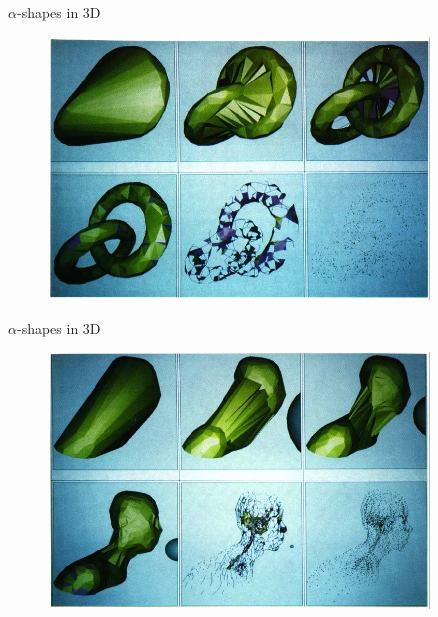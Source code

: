 \begin{frame}{$\alpha$-shapes in 3D}
        \begin{figure}
            \centering
            \includegraphics[width=0.9\textwidth]{figs/L19-alpha-shapes-3D-1.jpg}
        \end{figure}
\end{frame}

\begin{frame}{$\alpha$-shapes in 3D}
        \begin{figure}
            \centering
            \includegraphics[width=0.9\textwidth]{figs/L19-alpha-shapes-3D-2.jpg}
        \end{figure}
\end{frame}


